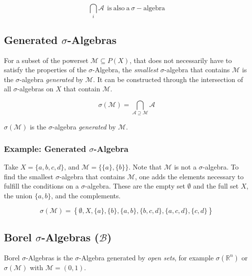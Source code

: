 \begin{equation}
\bigcap_i \mathscr{A} \ \ \mathrm{is\ also\ a\ }\sigma-\mathrm{algebra}
\end{equation}


\subsection{Generated $\sigma$-Algebras}

For a subset of the powerset $\mathscr{M} \subseteq P(X)$, that does not necessarily have to satisfy the properties of the $\sigma$-Algebra, the \textit{smallest} $\sigma$-algebra that contains $\mathscr{M}$ is the $\sigma$-algebra \textit{generated} by $\mathscr{M}$. It can be constructed through the intersection of all $\sigma$-algebras  on $X$ that contain $\mathscr{M}$. 

\begin{equation}
\sigma(\mathscr{M}) = \bigcap_{\mathscr{A}\supseteq\mathscr{M}}\mathscr{A}
\end{equation}

$\sigma(\mathscr{M})$ is the $\sigma$-algebra \textit{generated} by $\mathscr{M}$. 

\subsubsection{Example: Generated $\sigma$-Algebra}

Take $X = \{a,b,c,d\}$, and $\mathscr{M} = \{ \{a\}, \{b\}\}$. Note that $\mathscr{M}$ is not a $\sigma$-algebra. To find the smallest $\sigma$-algebra that contains $\mathscr{M}$, one adds the elements necessary to fulfill the conditions on a $\sigma$-algebra. These are the empty set $\emptyset$ and the full set $X$, the union $\{a,b\}$, and the complements.

\begin{equation}
\sigma(\mathscr{M}) = \left\{ \emptyset, X, \{a\}, \{b\}, \{a,b\}, \{b,c,d\}, \{a,c,d\}, \{c,d\} \right\}
\end{equation}


\subsection{Borel $\sigma$-Algebras ($\mathscr{B}$)	}

Borel $\sigma$-Algebras is the $\sigma$-Algebra generated by \textit{open sets}, for example $\sigma(\mathbb{R}^n)$ or $\sigma(\mathscr{M})$ with $\mathscr{M} = (0,1)$.


